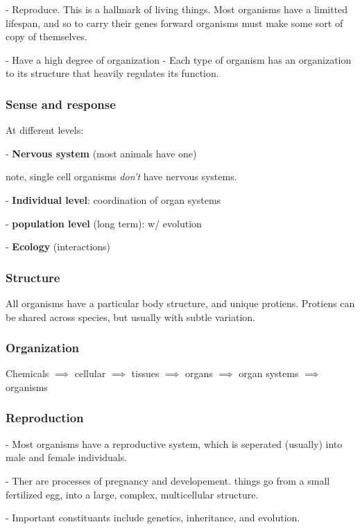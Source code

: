 \documentclass{article}
\theoremstyle{definition}
\begin{document}
- Reproduce. This is a hallmark of living things. Most organisms have a limitted lifespan, and so to carry their genes forward organisms must make some sort of copy of themselves.

- Have a high degree of organization - Each type of organism has an organization to its structure that heavily regulates its function.

\subsubsection{Sense and response}

At different levels: 

- \textbf{Nervous system} (most animals have one)

\indent\indent* note, single cell organisms \textit{don't} have nervous systems.

- \textbf{Individual level}: coordination of organ systems

- \textbf{population level} (long term): w/ evolution

- \textbf{Ecology} (interactions)

\subsubsection{Structure}

All organisms have a particular body structure, and unique protiens. Protiens can be shared across species, but usually with subtle variation.

\subsubsection{Organization}

Chemicals $\implies$ cellular $\implies$ tissues $\implies$ organs $\implies$ organ systems $\implies$ organisms

\subsubsection{Reproduction}
\indent\indent- Most organisms have a reproductive system, which is seperated (usually) into male and female individuals.

- Ther are processes of pregnancy and developement.
\indent\indent * things go from a small fertilized egg, into a large, complex, multicellular structure.

- Important constituants include genetics, inheritance, and evolution.
\end{document}
